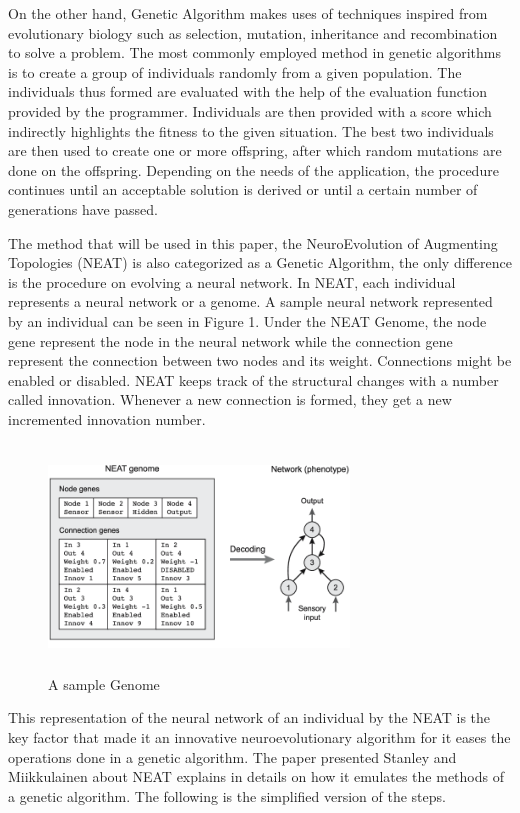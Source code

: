\documentclass[journal]{IEEEtran}
\begin{document}
On the other hand, Genetic Algorithm makes uses of techniques inspired from evolutionary biology such as selection, mutation, inheritance and recombination to solve a problem. The most commonly employed method in genetic algorithms is to create a group of individuals randomly from a given population. The individuals thus formed are evaluated with the help of the evaluation function provided by the programmer. Individuals are then provided with a score which indirectly highlights the fitness to the given situation. The best two individuals are then used to create one or more offspring, after which random mutations are done on the offspring. Depending on the needs of the application, the procedure continues until an acceptable solution is derived or until a certain number of generations have passed.

The method that will be used in this paper, the NeuroEvolution of Augmenting Topologies (NEAT) is also categorized as a Genetic Algorithm, the only difference is the procedure on evolving a neural network. In NEAT, each individual represents a neural network or a genome. A sample neural network represented by an individual can be seen in Figure 1. Under the NEAT Genome, the node gene represent the node in the neural network while the connection gene represent the connection between two nodes and its weight. Connections might be enabled or disabled. NEAT keeps track of the structural changes with a number called innovation. Whenever a new connection is formed, they get a new incremented innovation number.

\begin{figure}[htbp]
    \begin{center}
        \includegraphics[width=8cm, height=6cm]{Genome.png}
        \caption{A sample Genome}
    \end{center}    
\end{figure}

This representation of the neural network of an individual by the NEAT is the key factor that made it an innovative neuroevolutionary algorithm for it eases the operations done in a genetic algorithm. The paper presented Stanley and Miikkulainen about NEAT explains in details on how it emulates the methods of a genetic algorithm. The following is the simplified version of the steps.
\end{document}
